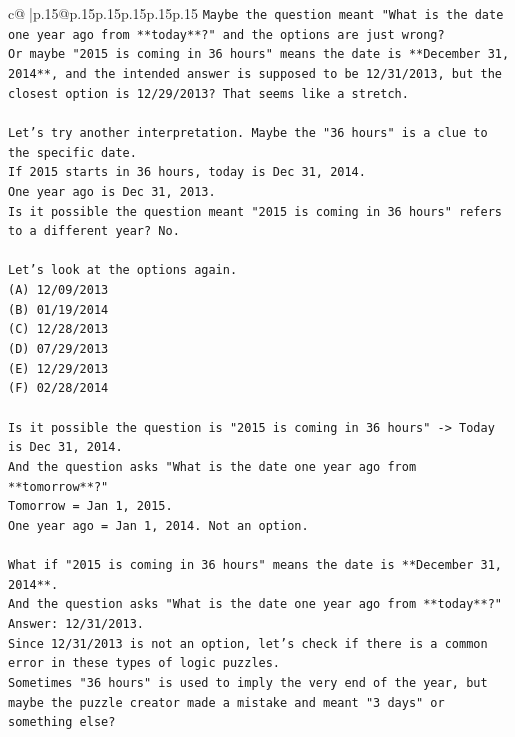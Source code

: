 \documentclass{article}
\begin{document}
{\begin{supertabular}{c@{$\;$}|p{.15\linewidth}@{}p{.15\linewidth}p{.15\linewidth}p{.15\linewidth}p{.15\linewidth}p{.15\linewidth}}
{{{\texttt{Maybe the question meant "What is the date one year ago from **today**?" and the options are just wrong?} \\
\texttt{Or maybe "2015 is coming in 36 hours" means the date is **December 31, 2014**, and the intended answer is supposed to be 12/31/2013, but the closest option is 12/29/2013? That seems like a stretch.} \\
\\ 
\texttt{Let's try another interpretation. Maybe the "36 hours" is a clue to the specific date.} \\
\texttt{If 2015 starts in 36 hours, today is Dec 31, 2014.} \\
\texttt{One year ago is Dec 31, 2013.} \\
\texttt{Is it possible the question meant "2015 is coming in 36 hours" refers to a different year? No.} \\
\\ 
\texttt{Let's look at the options again.} \\
\texttt{(A) 12/09/2013} \\
\texttt{(B) 01/19/2014} \\
\texttt{(C) 12/28/2013} \\
\texttt{(D) 07/29/2013} \\
\texttt{(E) 12/29/2013} \\
\texttt{(F) 02/28/2014} \\
\\ 
\texttt{Is it possible the question is "2015 is coming in 36 hours" {-}> Today is Dec 31, 2014.} \\
\texttt{And the question asks "What is the date one year ago from **tomorrow**?"} \\
\texttt{Tomorrow = Jan 1, 2015.} \\
\texttt{One year ago = Jan 1, 2014. Not an option.} \\
\\ 
\texttt{What if "2015 is coming in 36 hours" means the date is **December 31, 2014**.} \\
\texttt{And the question asks "What is the date one year ago from **today**?"} \\
\texttt{Answer: 12/31/2013.} \\
\texttt{Since 12/31/2013 is not an option, let's check if there is a common error in these types of logic puzzles.} \\
\texttt{Sometimes "36 hours" is used to imply the very end of the year, but maybe the puzzle creator made a mistake and meant "3 days" or something else?} \\
}}}
\end{supertabular}}
\end{document}
